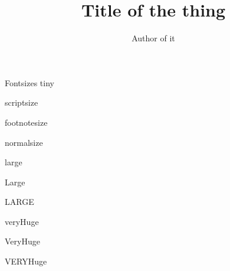 \documentclass[final,serif]{beamer}
\title{Title of the thing}
\author{Author of it}
\begin{document}
\begin{frame}
    \maketitle
        \vfill
    \begin{block}{\large Fontsizes}
      \centering
      {\tiny tiny}\par
      {\scriptsize scriptsize}\par
      {\footnotesize footnotesize}\par
      {\normalsize normalsize}\par
      {\large large}\par
      {\Large Large}\par
      {\LARGE LARGE}\par
      {\veryHuge veryHuge}\par
      {\VeryHuge VeryHuge}\par
      {\VERYHuge VERYHuge}\par
    \end{block}
    \vfill
\end{frame}
\end{document}
